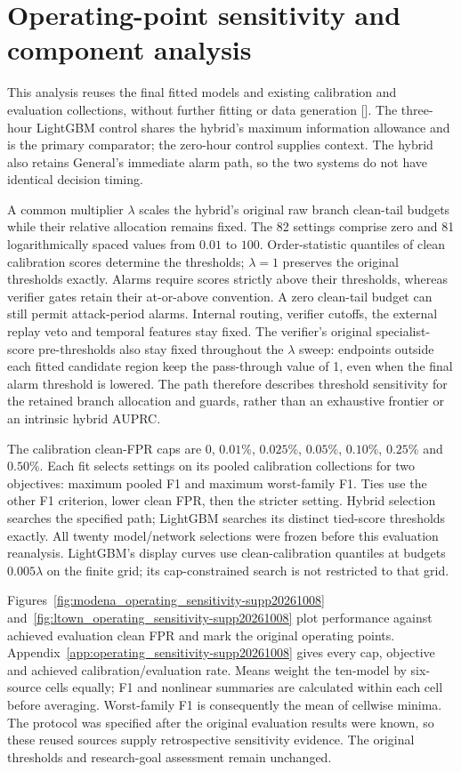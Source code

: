 \FloatBarrier
\section{Operating-point sensitivity and component analysis}
\label{sec:operating_sensitivity-supp20261008}
This analysis reuses the final fitted models and existing calibration and evaluation collections, without further fitting or data generation []. The three-hour LightGBM control shares the hybrid's maximum information allowance and is the primary comparator; the zero-hour control supplies context. The hybrid also retains General's immediate alarm path, so the two systems do not have identical decision timing.

A common multiplier $\lambda$ scales the hybrid's original raw branch clean-tail budgets while their relative allocation remains fixed. The 82 settings comprise zero and 81 logarithmically spaced values from $0.01$ to $100$. Order-statistic quantiles of clean calibration scores determine the thresholds; $\lambda=1$ preserves the original thresholds exactly. Alarms require scores strictly above their thresholds, whereas verifier gates retain their at-or-above convention. A zero clean-tail budget can still permit attack-period alarms. Internal routing, verifier cutoffs, the external replay veto and temporal features stay fixed. The verifier's original specialist-score pre-thresholds also stay fixed throughout the $\lambda$ sweep: endpoints outside each fitted candidate region keep the pass-through value of 1, even when the final alarm threshold is lowered. The path therefore describes threshold sensitivity for the retained branch allocation and guards, rather than an exhaustive frontier or an intrinsic hybrid AUPRC.

The calibration clean-FPR caps are $0$, $0.01\%$, $0.025\%$, $0.05\%$, $0.10\%$, $0.25\%$ and $0.50\%$. Each fit selects settings on its pooled calibration collections for two objectives: maximum pooled F1 and maximum worst-family F1. Ties use the other F1 criterion, lower clean FPR, then the stricter setting. Hybrid selection searches the specified path; LightGBM searches its distinct tied-score thresholds exactly. All twenty model/network selections were frozen before this evaluation reanalysis. LightGBM's display curves use clean-calibration quantiles at budgets $0.005\lambda$ on the finite grid; its cap-constrained search is not restricted to that grid.

Figures~\ref{fig:modena_operating_sensitivity-supp20261008} and~\ref{fig:ltown_operating_sensitivity-supp20261008} plot performance against achieved evaluation clean FPR and mark the original operating points. Appendix~\ref{app:operating_sensitivity-supp20261008} gives every cap, objective and achieved calibration/evaluation rate. Means weight the ten-model by six-source cells equally; F1 and nonlinear summaries are calculated within each cell before averaging. Worst-family F1 is consequently the mean of cellwise minima. The protocol was specified after the original evaluation results were known, so these reused sources supply retrospective sensitivity evidence. The original thresholds and research-goal assessment remain unchanged.


